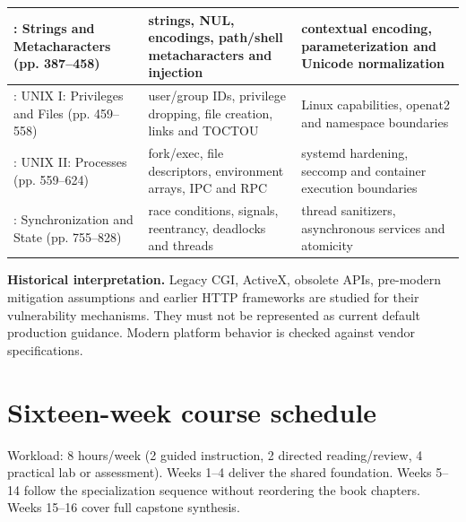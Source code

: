 \documentclass[10pt,letterpaper]{article}
\begin{document}
\begin{longtable}{>{\raggedright\arraybackslash}p{}>{\raggedright\arraybackslash}p{}>{\raggedright\arraybackslash}p{}}
8: Strings and Metacharacters (pp. 387--458) & strings, NUL, encodings, path/shell metacharacters and injection & contextual encoding, parameterization and Unicode normalization\\\midrule
9: UNIX I: Privileges and Files (pp. 459--558) & user/group IDs, privilege dropping, file creation, links and TOCTOU & Linux capabilities, openat2 and namespace boundaries\\\midrule
10: UNIX II: Processes (pp. 559--624) & fork/exec, file descriptors, environment arrays, IPC and RPC & systemd hardening, seccomp and container execution boundaries\\\midrule
13: Synchronization and State (pp. 755--828) & race conditions, signals, reentrancy, deadlocks and threads & thread sanitizers, asynchronous services and atomicity\\\midrule
\bottomrule\end{longtable}\endgroup
\begin{historynote}\textbf{Historical interpretation.} Legacy CGI, ActiveX, obsolete APIs, pre-modern mitigation assumptions and earlier HTTP frameworks are studied for their vulnerability mechanisms. They must not be represented as current default production guidance. Modern platform behavior is checked against vendor specifications.\end{historynote}
\section{Sixteen-week course schedule}
Workload: 8 hours/week (2 guided instruction, 2 directed reading/review, 4 practical lab or assessment). Weeks 1--4 deliver the shared foundation. Weeks 5--14 follow the specialization sequence without reordering the book chapters. Weeks 15--16 cover full capstone synthesis.
\end{document}
